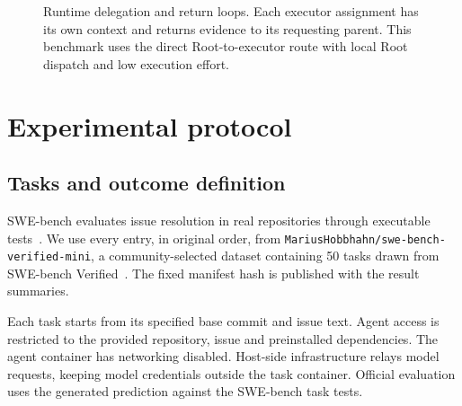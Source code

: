 \documentclass[10pt,a4paper]{article}
\begin{document}
\begin{figure}[ht]
\centering
{}
\caption{Runtime delegation and return loops. Each executor assignment has its
own context and returns evidence to its requesting parent. This benchmark uses
the direct Root-to-executor route with local Root dispatch and low execution
effort.}
\label{fig:path}
\end{figure}

\section{Experimental protocol}

\subsection{Tasks and outcome definition}

SWE-bench evaluates issue resolution in real repositories through executable
tests~\cite{swebench}. We use every entry, in original order, from
\texttt{MariusHobbhahn/swe-bench-verified-mini}, a community-selected dataset
containing 50 tasks drawn from SWE-bench Verified~\cite{mini}. The fixed
manifest hash is published with the result summaries.

Each task starts from its specified base commit and issue text. Agent access
is restricted to the provided repository, issue and preinstalled dependencies.
The agent container has networking disabled. Host-side infrastructure relays
model requests, keeping model credentials outside the task container. Official
evaluation uses the generated prediction against the SWE-bench task tests.
\end{document}
